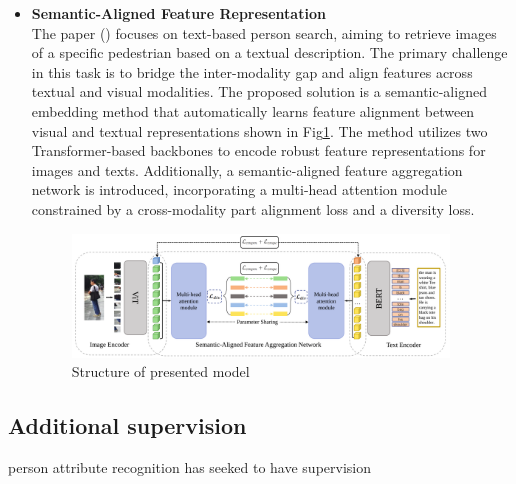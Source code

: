 \begin{itemize}
    \item \textbf{Semantic-Aligned Feature Representation}\\
    The paper (\cite{li2021learning}) focuses on text-based person search, aiming to retrieve images of a specific pedestrian based on a textual description. The primary challenge in this task is to bridge the inter-modality gap and align features across textual and visual modalities. The proposed solution is a semantic-aligned embedding method that automatically learns feature alignment between visual and textual representations shown in Fig\ref{fig:sem_align}. The method utilizes two Transformer-based backbones to encode robust feature representations for images and texts. Additionally, a semantic-aligned feature aggregation network is introduced, incorporating a multi-head attention module constrained by a cross-modality part alignment loss and a diversity loss. 

    \begin{figure}[htbp]
        \begin{center}
            \includegraphics[width=10cm]{img/sem_feature.png}
            \caption{Structure of presented model}\label{fig:sem_align}
        \end{center}
    \end{figure}
\end{itemize}


\subsection{Additional supervision}
person attribute recognition has seeked to have supervision 



